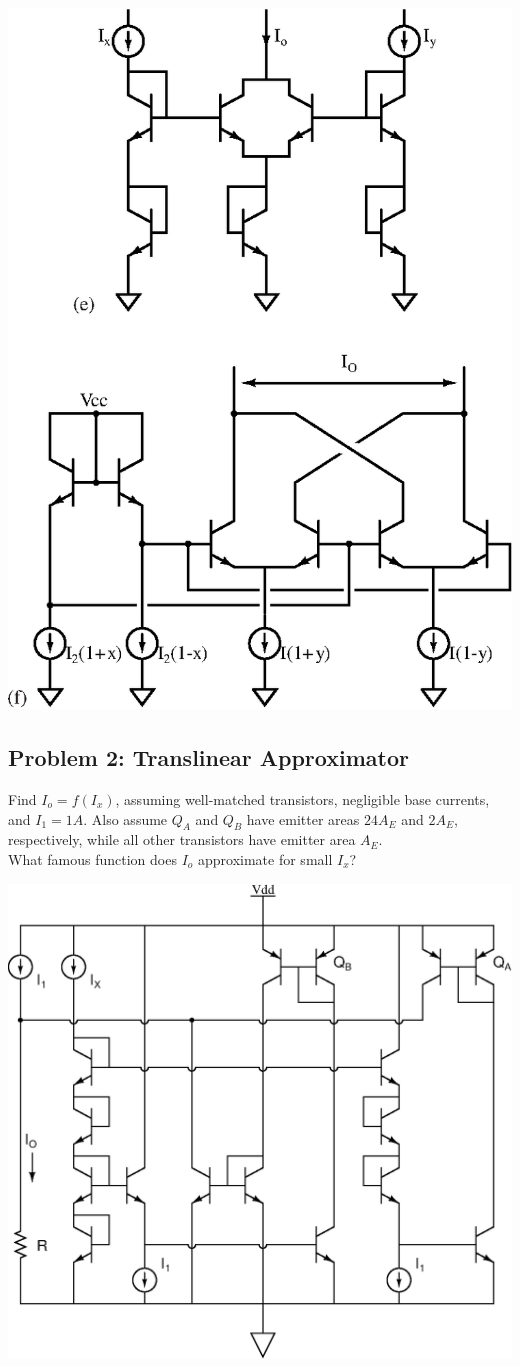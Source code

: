 \documentclass[11pt,twoside]{article}
\begin{document}
\clearpage
\begin{center}
\includegraphics[width=.6\textwidth]{trans2.eps}
\end{center}
\clearpage
\subsection*{Problem 2: Translinear Approximator}
Find $I_o=f(I_x)$, assuming well-matched transistors, negligible base currents, and $I_1=1A$.
Also assume $Q_A$ and $Q_B$ have emitter areas $24A_E$ and $2A_E$, respectively, while all other transistors have emitter area $A_E$. \\
What famous function does $I_o$ approximate for small $I_x$?\\
\vspace{4ex}
\begin{center}
\includegraphics[width=.9\textwidth]{cos.eps}
\end{center}
\end{document}

